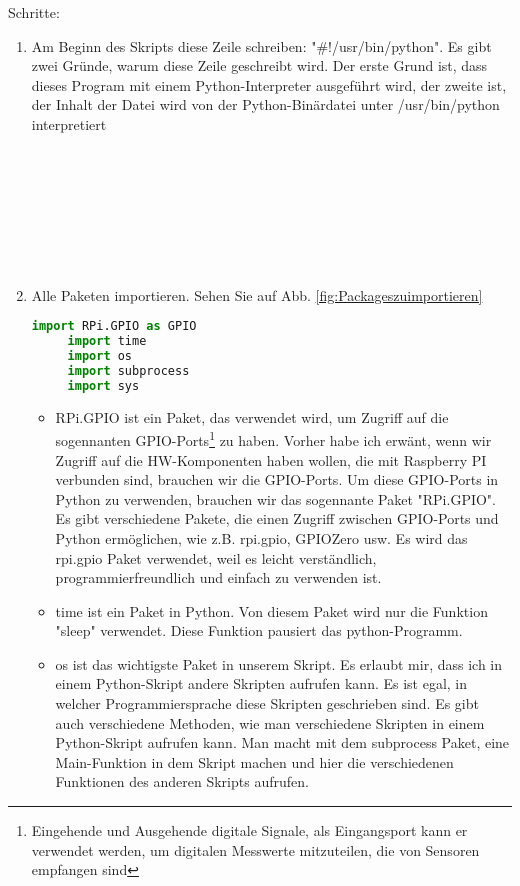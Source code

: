 Schritte: 
\begin{enumerate}
	
	\item Am Beginn des Skripts diese Zeile schreiben: "\#!/usr/bin/python". Es gibt zwei Gr\"unde, warum diese Zeile geschreibt wird. Der erste Grund ist, dass dieses Program mit einem Python-Interpreter ausgef\"uhrt wird, der zweite ist, der Inhalt der Datei wird von der Python-Binärdatei unter /usr/bin/python interpretiert \\ \\ \\ \\ \\ \\ \\ \\ 
	 \item Alle Paketen importieren. Sehen Sie auf Abb. \ref{fig:Packageszuimportieren} 
	 \begin{lstlisting}[caption={Packages zu importieren},label={fig:Packageszuimportieren},language=Python]
	 import RPi.GPIO as GPIO
	 import time
	 import os
	 import subprocess
	 import sys
	 \end{lstlisting}
	 \begin{itemize}
	 	
	 \item RPi.GPIO ist ein Paket, das verwendet wird, um Zugriff auf die sogennanten GPIO-Ports\footnote{Eingehende und Ausgehende digitale Signale, als Eingangsport kann er verwendet werden, um  digitalen Messwerte mitzuteilen, die von Sensoren empfangen sind} zu haben. Vorher habe ich erw\"ant, wenn wir Zugriff auf die HW-Komponenten haben wollen, die mit Raspberry PI verbunden sind, brauchen wir die GPIO-Ports. Um diese GPIO-Ports in Python zu verwenden, brauchen wir das sogennante Paket "RPi.GPIO". Es gibt verschiedene Pakete, die einen Zugriff zwischen GPIO-Ports und Python erm\"oglichen, wie z.B. rpi.gpio, GPIOZero usw. Es wird das rpi.gpio Paket verwendet, weil es leicht verst\"andlich, programmierfreundlich und einfach zu verwenden ist. \cite{rpigpio}
	 
	 \item time ist ein Paket in Python. Von diesem Paket wird nur die Funktion "sleep" verwendet. Diese Funktion pausiert das python-Programm. \cite{timepackage}
	 
	 \item os ist das wichtigste Paket in unserem Skript. Es erlaubt mir, dass ich in einem Python-Skript andere Skripten aufrufen kann. Es ist egal, in welcher Programmiersprache diese Skripten geschrieben sind. Es gibt auch verschiedene Methoden, wie man verschiedene Skripten in einem Python-Skript aufrufen kann. Man macht mit dem subprocess Paket, eine Main-Funktion in dem Skript machen und hier die verschiedenen Funktionen des anderen Skripts aufrufen. 
	 

\end{itemize}
\end{enumerate}
